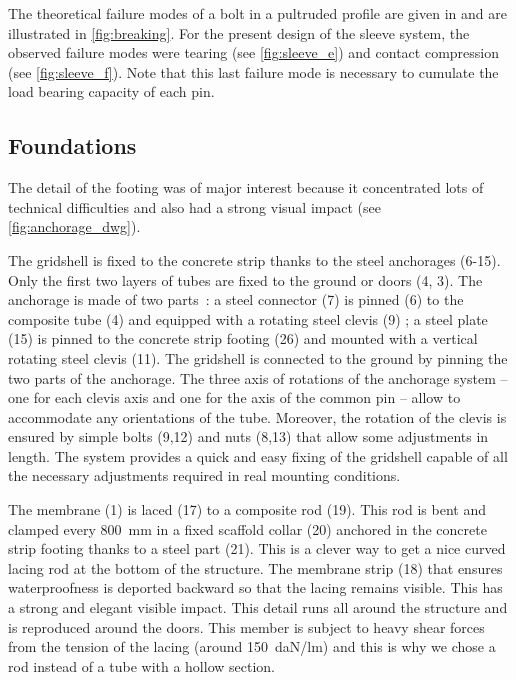 The theoretical failure modes of a bolt in a pultruded profile are given in \cite{Fiberline2003} and are illustrated in \cref{fig:breaking}. For the present design of the sleeve system, the observed failure modes were tearing (see \cref{fig:sleeve_e}) and contact compression (see \cref{fig:sleeve_f}). Note that this last failure mode is necessary to cumulate the load bearing capacity of each pin.

\pagebreak
\subsection{Foundations}
The detail of the footing was of major interest because it concentrated lots of technical difficulties and also had a strong visual impact (see \cref{fig:anchorage_dwg}).

The gridshell is fixed to the concrete strip thanks to the steel anchorages (6-15). Only the first two layers of tubes are fixed to the ground or doors (4, 3). The anchorage is made of two parts~: a steel connector (7) is pinned (6) to the composite tube (4) and equipped with a rotating steel clevis (9) ; a steel plate (15) is pinned to the concrete strip footing (26) and mounted with a vertical rotating steel clevis (11). The gridshell is connected to the ground by pinning the two parts of the anchorage. The three axis of rotations of the anchorage system -- one for each clevis axis and one for the axis of the common pin -- allow to accommodate any orientations of the tube. Moreover, the rotation of the clevis is ensured by simple bolts (9,12) and nuts (8,13) that allow some adjustments in length. The system provides a quick and easy fixing of the gridshell capable of all the necessary adjustments required in real mounting conditions.

The membrane (1) is laced (17) to a composite rod (19). This rod is bent and clamped every \SI{800}{mm} in a fixed scaffold collar (20) anchored in the concrete strip footing thanks to a steel part (21). This is a clever way to get a nice curved lacing rod at the bottom of the structure. The membrane strip (18) that ensures waterproofness is deported backward so that the lacing remains visible. This has a strong and elegant visible impact. This detail runs all around the structure and is reproduced around the doors. This member is subject to heavy shear forces from the tension of the lacing (around \SI{150}{daN/lm}) and this is why we chose a rod instead of a tube with a hollow section.

